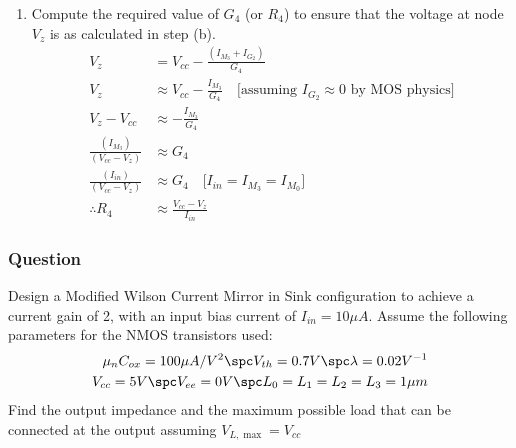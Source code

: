 \begin{enumerate}
    can be computed using the current gain relation
    from step (a).
  \item Compute the required value of $G_4$ (or
    $R_4$) to ensure that the voltage at node
    $V_{z}$ is as calculated in step (b).
    \begin{align*}
      V_{z} &= V_{cc} - \frac{(I_{M_3} + I_{G_2})}{G_4} \\
      V_{z} &\approx V_{cc} - \frac{I_{M_3}}{G_4} \quad \text{[assuming } I_{G_2} \approx 0 \text{ by MOS physics]} \\
      V_{z} - V_{cc} &\approx - \frac{I_{M_3}}{G_4} \\
      \frac{(I_{M_3})}{(V_{cc} - V_{z})} &\approx G_4 \\
      \frac{(I_{in})}{(V_{cc} - V_{z})} &\approx G_4 \quad \text{[} I_{in} = I_{M_3} = I_{M_0} \text{]} \\
      \therefore R_4 &\approx \frac{V_{cc} - V_{z}}{I_{in}}
    \end{align*}
\end{enumerate}

\subsubsection{Question}
Design a Modified Wilson Current Mirror in
Sink configuration to achieve a current gain of
2, with an input bias current of $I_{in} =
10\mu A$. Assume the following parameters for
the NMOS transistors used:
\begin{align*}
  \mu_n C_{ox} = 100 \mu A/V^2 \spc V_{th} = 0.7 V \spc \lambda = 0.02 V^{-1} \\
  V_{cc} = 5 V \spc V_{ee} = 0 V \spc L_0 = L_1 = L_2 = L_3 = 1 \mu m
\end{align*}
Find the output impedance and the maximum
possible load that can be connected at the output
assuming $V_{L,\max} = V_{cc}$
